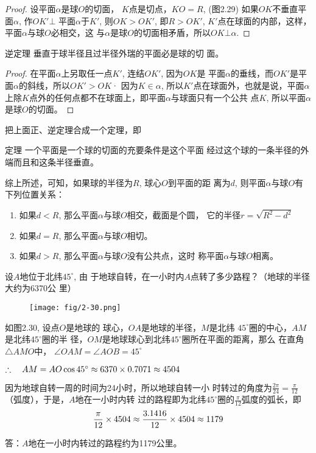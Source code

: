 \begin{proof}
    设平面$\alpha$是球$O$的切面，
    $K$点是切点，$KO=R$, (图2.29)
    如果$OK$不垂直平面$\alpha$, 作$OK'\bot$
    平面$\alpha$于$K'$, 则$OK>OK'$, 即$R>OK'$, $K'$点在球面的内部，这样，平面$\alpha$与球$O$必相交，这
与$\alpha$是球$O$的切面相矛盾，所以$OK\bot\alpha$.
\end{proof}

\begin{blk}
  {逆定理} 垂直于球半径且过半径外瑞的平面必是球的切
面。  
\end{blk}

\begin{proof}
在平面$\alpha$上另取任一点$K'$, 连结$OK'$, 因为$OK$是
平面$\alpha$的垂线，而$OK'$是平面$\alpha$的斜线，所以$OK'>OK$· 
因为$K\in\alpha$, 所以$K'$点在球面外，也就是说，平面$\alpha$上除$K$点外的任何点都不在球面上，即平面$\alpha$与球面只有一个公共
点$K$, 所以平面$\alpha$是球$O$的切面。
\end{proof}

把上面正、逆定理合成一个定理，即

\begin{blk}
    {定理} 一个平面是一个球的切面的充要条件是这个平面
经过这个球的一条半径的外端而且和这条半径垂直。
\end{blk}

综上所述，可知，如果球的半径为$R$, 球心$O$到平面的距
离为$d$, 则平面$\alpha$与球$O$有下列位置关系：
\begin{enumerate}
\item 如果$d<R$, 那么平面$\alpha$与球$O$相交，截面是个圆，
它的半径$r=\sqrt{R^2-d^2}$
\item 如果$d=R$, 那么平面$\alpha$与球$O$相切。
\item 如果$d>R$, 那么平面$\alpha$与球$O$没有公共点，这时
称平面$\alpha$与球$O$相离。
\end{enumerate}

\begin{example}
    设$A$地位于北纬$45^{\circ}$, 由
于地球自转，在一小时内$A$点转了多少路程？（地球的半径大约为6370公
里）
\end{example}

\begin{figure}[htp]
    \centering
\texttt{[image: fig/2-30.png]}
    \caption{}
\end{figure}

\begin{solution}
    如图2.30, 设点$O$是地球的
    球心，$OA$是地球的半径，$M$是北纬
    $45^{\circ}$圈的中心，$AM$是北纬$45^{\circ}$圈的半
    径，$OM$是地球球心到北纬$45^{\circ}$圈所在平面的距离，那么
在直角$\triangle AMO$中，
$\angle OAM=\angle AOB=45^{\circ}$

$\therefore\quad AM=AO\cos45^{\circ}\approx 6370\times0.7071\approx 4504$

因为地球自转一周的时间为24小时，所以地球自转一小
时转过的角度为$\frac{2\pi}{24}=\frac{\pi}{12}$（弧度），于是，$A$地在一小时内转
过的路程即为北纬$45^{\circ}$圈的$\frac{\pi}{12}$弧度的弧长，即
\[\dfrac{\pi}{12}\times 4504\approx \dfrac{3.1416}{12}\times 4504\approx 1179\]

答：$A$地在一小时内转过的路程约为1179公里。
\end{solution}


